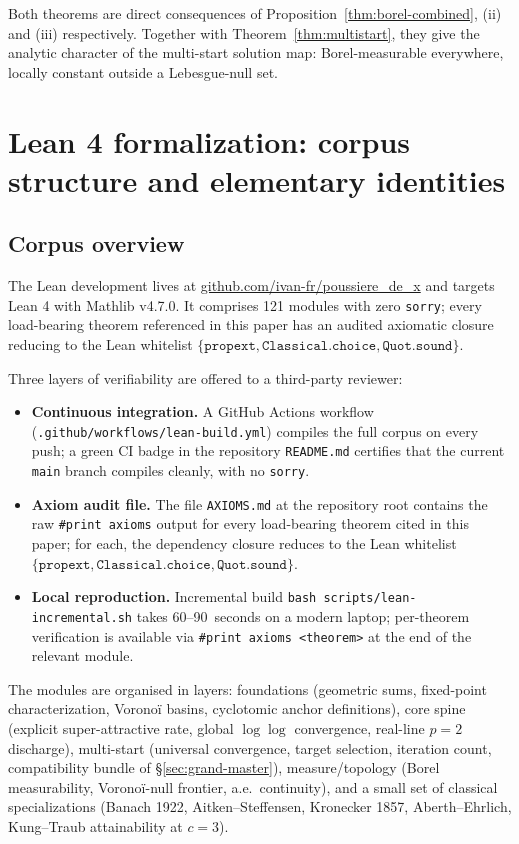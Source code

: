 \documentclass[11pt,a4paper]{article}
\theoremstyle{definition}
\begin{document}
Both theorems are direct consequences of Proposition~\ref{thm:borel-combined}, (ii) and (iii) respectively. Together with Theorem~\ref{thm:multistart}, they give the analytic character of the multi-start solution map: Borel-measurable everywhere, locally constant outside a Lebesgue-null set.

\section{Lean 4 formalization: corpus structure and elementary identities}
\label{sec:lean-corpus}

\subsection{Corpus overview}

The Lean development lives at
\url{github.com/ivan-fr/poussiere_de_x} and targets Lean 4 with Mathlib v4.7.0. It comprises 121 modules with zero \texttt{sorry}; every load-bearing theorem referenced in this paper has an audited axiomatic closure reducing to the Lean whitelist $\{\texttt{propext}, \texttt{Classical.choice}, \texttt{Quot.sound}\}$.

Three layers of verifiability are offered to a third-party reviewer:
\begin{itemize}
  \item \textbf{Continuous integration.} A GitHub Actions workflow (\texttt{.github/workflows/lean-build.yml}) compiles the full corpus on every push; a green CI badge in the repository \texttt{README.md} certifies that the current \texttt{main} branch compiles cleanly, with no \texttt{sorry}.
  \item \textbf{Axiom audit file.} The file \texttt{AXIOMS.md} at the repository root contains the raw \texttt{\#print axioms} output for every load-bearing theorem cited in this paper; for each, the dependency closure reduces to the Lean whitelist $\{\texttt{propext}, \texttt{Classical.choice}, \texttt{Quot.sound}\}$.
  \item \textbf{Local reproduction.} Incremental build \texttt{bash scripts/lean-incremental.sh} takes 60--90~seconds on a modern laptop; per-theorem verification is available via \texttt{\#print axioms <theorem>} at the end of the relevant module.
\end{itemize}
The modules are organised in layers: foundations (geometric sums, fixed-point characterization, Voronoï basins, cyclotomic anchor definitions), core spine (explicit super-attractive rate, global $\log\log$ convergence, real-line $p = 2$ discharge), multi-start (universal convergence, target selection, iteration count, compatibility bundle of \S\ref{sec:grand-master}), measure/topology (Borel measurability, Voronoï-null frontier, a.e.\ continuity), and a small set of classical specializations (Banach 1922, Aitken--Steffensen, Kronecker 1857, Aberth--Ehrlich, Kung--Traub attainability at $c=3$).
\end{document}
